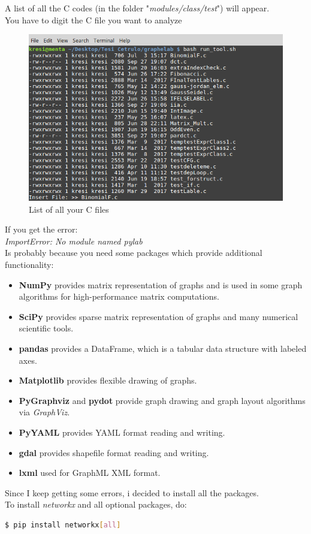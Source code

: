 {A list of all the C codes (in the folder "\textit{modules/class/test}") will appear.\\
You have to digit the C file you want to analyze
	\begin{figure}[h]
		\centering
		\includegraphics[width=\textwidth]{imm/tessa/list_C.png}  
		\caption{List of all your C files}
		\label{listC}
	\end{figure}
If you get the error:\\
\textit{ImportError: No module named pylab}\\
Is probably because you need some packages which provide additional functionality:
\begin{itemize}
	\item \textbf{NumPy} provides matrix representation of
	graphs and is used in some graph algorithms for high-performance matrix
	computations.
	\item \textbf{SciPy} provides sparse matrix representation
	of graphs and many numerical scientific tools.
	\item \textbf{pandas} provides a DataFrame, which
	is a tabular data structure with labeled axes.
	\item \textbf{Matplotlib} provides flexible drawing of
	graphs.
	\item \textbf{PyGraphviz} and \textbf{pydot} provide graph drawing
	and graph layout algorithms via \textit{GraphViz}.
	\item \textbf{PyYAML} provides YAML format reading and writing.
	\item\textbf{ gdal} provides shapefile format reading and writing.
	\item \textbf{lxml} used for GraphML XML format.
\end{itemize}
Since I keep getting some errors, i decided to install all the packages.\\
To install \textit{networkx} and all optional packages, do:\\
\begin{lstlisting}[language=bash]
$ pip install networkx[all]
\end{lstlisting}

}
